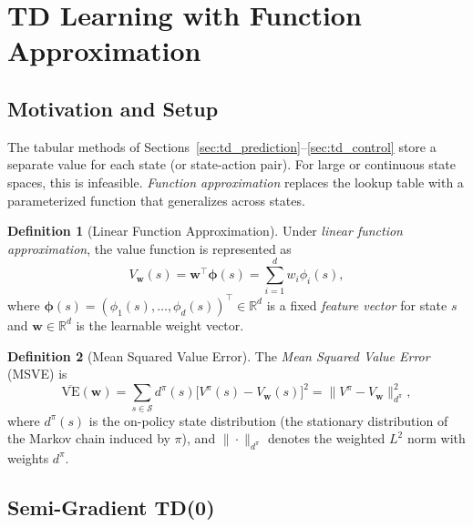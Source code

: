 \documentclass[11pt,a4paper]{article}
\theoremstyle{definition}
\newtheorem{definition}{Definition}[section]
\theoremstyle{plain}
\theoremstyle{remark}
\newcommand{\R}{\mathbb{R}}
\begin{document}
\section{TD Learning with Function Approximation}
\label{sec:function_approx}

\subsection{Motivation and Setup}
\label{subsec:fa_motivation}

The tabular methods of Sections~\ref{sec:td_prediction}--\ref{sec:td_control} store a separate value for each state (or state-action pair). For large or continuous state spaces, this is infeasible. \emph{Function approximation} replaces the lookup table with a parameterized function that generalizes across states.

\begin{definition}[Linear Function Approximation]
\label{def:linear_fa}
Under \emph{linear function approximation}, the value function is represented as
\begin{equation}
    V_{\bm{w}}(s) = \bm{w}^\top \bm{\phi}(s) = \sum_{i=1}^d w_i \phi_i(s),
    \label{eq:linear_fa}
\end{equation}
where $\bm{\phi}(s) = (\phi_1(s), \ldots, \phi_d(s))^\top \in \R^d$ is a fixed \emph{feature vector} for state $s$ and $\bm{w} \in \R^d$ is the learnable weight vector.
\end{definition}

\begin{definition}[Mean Squared Value Error]
\label{def:msve}
The \emph{Mean Squared Value Error} (MSVE) is
\begin{equation}
    \overline{\text{VE}}(\bm{w}) = \sum_{s \in \mathcal{S}} d^\pi(s) \bigl[V^\pi(s) - V_{\bm{w}}(s)\bigr]^2 = \|V^\pi - V_{\bm{w}}\|_{d^\pi}^2,
    \label{eq:msve}
\end{equation}
where $d^\pi(s)$ is the on-policy state distribution (the stationary distribution of the Markov chain induced by $\pi$), and $\|\cdot\|_{d^\pi}$ denotes the weighted $L^2$ norm with weights $d^\pi$.
\end{definition}

\subsection{Semi-Gradient TD(0)}
\label{subsec:semi_gradient_td}
\end{document}
